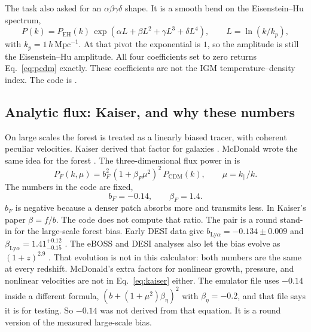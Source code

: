 \documentclass[11pt]{article}
\begin{document}
The task also asked for an $\alpha\beta\gamma\delta$ shape. It is a smooth bend on the Eisenstein--Hu spectrum,
\begin{equation}
\label{eq:abgd}
P(k)=P_\mathrm{EH}(k)\,
\exp(\alpha L+\beta L^{2}+\gamma L^{3}+\delta L^{4}),
\qquad
L=\ln(k/k_p),
\end{equation}
with $k_p=1\,h\,\mathrm{Mpc}^{-1}$. At that pivot the exponential is $1$, so the amplitude is still the Eisenstein--Hu amplitude. All four coefficients set to zero returns Eq.~\eqref{eq:pcdm} exactly. These coefficients are not the IGM temperature--density index. The code is .

\subsection{Analytic flux: Kaiser, and why these numbers}

On large scales the forest is treated as a linearly biased tracer, with coherent peculiar velocities. Kaiser derived that factor for galaxies \cite{Kaiser:1987qv}. McDonald wrote the same idea for the forest \cite{McDonald:2001fe}. The three-dimensional flux power in  is
\begin{equation}
\label{eq:kaiser}
P_F(k,\mu)
=
b_F^{2}\,(1+\beta_F\mu^{2})^{2}\,P_\mathrm{CDM}(k),
\qquad
\mu=k_\parallel/k.
\end{equation}
The numbers in the code are fixed,
\begin{equation}
b_F=-0.14, \qquad \beta_F=1.4.
\end{equation}
$b_F$ is negative because a denser patch absorbs more and transmits less. In Kaiser's paper $\beta=f/b$. The code does not compute that ratio. The pair is a round stand-in for the large-scale forest bias. Early DESI data give $b_{\mathrm{Ly}\alpha}=-0.134\pm 0.009$ and $\beta_{\mathrm{Ly}\alpha}=1.41^{+0.12}_{-0.15}$ \cite{Gordon:2023dua}. The eBOSS and DESI analyses also let the bias evolve as $(1+z)^{2.9}$ \cite{eBOSS:2020tmo}. That evolution is not in this calculator: both numbers are the same at every redshift. McDonald's extra factors for nonlinear growth, pressure, and nonlinear velocities are not in Eq.~\eqref{eq:kaiser} either. The emulator file  uses $-0.14$ inside a different formula, $(b+(1+\mu^{2})\beta_\eta)^{2}$ with $\beta_\eta=-0.2$, and that file says it is for testing. So $-0.14$ was not derived from that equation. It is a round version of the measured large-scale bias.
\end{document}
